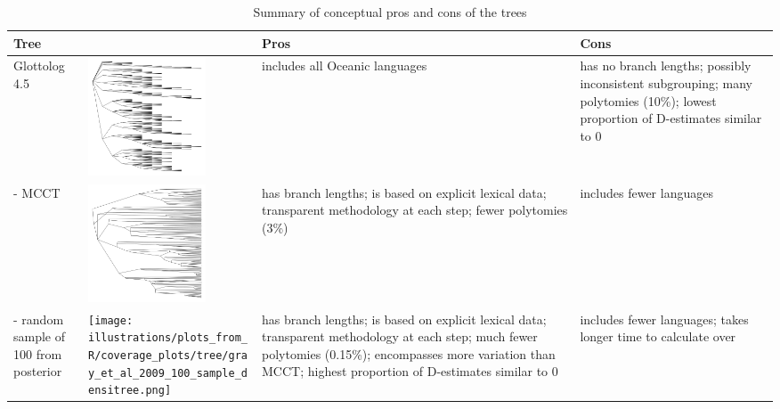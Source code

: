 \documentclass[12pt,letterpaper]{article}
\begin{document}
\begin{table}[ht]
\centering
\caption{Summary of conceptual pros and cons of the trees}
\label{trees_pros_cons}
\begin{tabular}{m{3cm}m{3.5cm}m{3.8cm}m{3.8cm}}
  \toprule
\textbf{Tree} & &\textbf{Pros} & \textbf{Cons} \\ \midrule
Glottolog 4.5 & \includegraphics[width=3.5cm]{illustrations/plots_from_R/coverage_plots/tree/Oceanic_glottolog_tree_bare.png} &includes all Oceanic languages & has no branch lengths; possibly inconsistent subgrouping; many polytomies (10\%); lowest proportion of D-estimates similar to 0 \\
\midrule
\citet{grayetal_2009} - MCCT & \includegraphics[width=3.5cm]{illustrations/plots_from_R/coverage_plots/tree/Oceanic_gray_et_al_tree_mcct_bare.png} &has branch lengths; is based on explicit lexical data; transparent methodology at each step; fewer polytomies (3\%) & includes fewer languages \\
\midrule
\citet{grayetal_2009} - random sample of 100 from posterior &  \texttt{[image: illustrations/plots\_from\_R/coverage\_plots/tree/gray\_et\_al\_2009\_100\_sample\_densitree.png]}& has branch lengths; is based on explicit lexical data; transparent methodology at each step; much fewer polytomies (0.15\%); encompasses more variation than MCCT; highest proportion of D-estimates similar to 0 & includes fewer languages; takes longer time to calculate over\\
\bottomrule
\end{tabular}
\end{table}

\FloatBarrier
\end{document}
